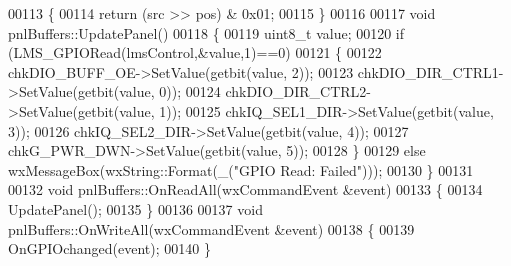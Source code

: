 \begin{DoxyCode}
00113 \{
00114     \textcolor{keywordflow}{return} (src >> pos) & 0x01;
00115 \}
00116 
00117 \textcolor{keywordtype}{void} pnlBuffers::UpdatePanel()
00118 \{
00119     uint8\_t value;
00120     \textcolor{keywordflow}{if} (LMS_GPIORead(lmsControl,&value,1)==0)
00121     \{
00122         chkDIO\_BUFF\_OE->SetValue(getbit(value, 2));
00123         chkDIO\_DIR\_CTRL1->SetValue(getbit(value, 0));
00124         chkDIO\_DIR\_CTRL2->SetValue(getbit(value, 1));
00125         chkIQ\_SEL1\_DIR->SetValue(getbit(value, 3));
00126         chkIQ\_SEL2\_DIR->SetValue(getbit(value, 4));
00127         chkG\_PWR\_DWN->SetValue(getbit(value, 5));
00128     \}
00129     \textcolor{keywordflow}{else} wxMessageBox(wxString::Format(\_(\textcolor{stringliteral}{"GPIO Read: Failed"})));
00130 \}
00131 
00132 \textcolor{keywordtype}{void} pnlBuffers::OnReadAll(wxCommandEvent &event)
00133 \{
00134     UpdatePanel();
00135 \}
00136 
00137 \textcolor{keywordtype}{void} pnlBuffers::OnWriteAll(wxCommandEvent &event)
00138 \{
00139     OnGPIOchanged(event);
00140 \}
\end{DoxyCode}
